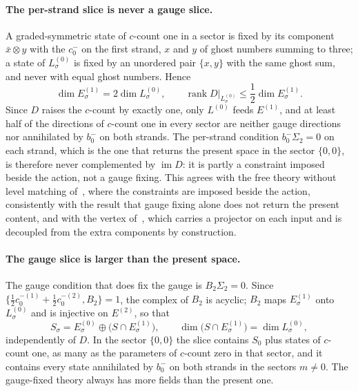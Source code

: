 \paragraph{The per-strand slice is never a gauge slice.}
A graded-symmetric state of $c$-count one in a sector is fixed by its component $\bar x \otimes y$ with the $c_0^-$ on the first strand, $x$ and $y$ of ghost numbers summing to three; a state of $L^{(0)}_\sigma$ is fixed by an unordered pair $\{ x, y \}$ with the same ghost sum, and never with equal ghost numbers.
Hence
\begin{equation}
  \label{eq:gbv:counting}
  \dim E^{(1)}_\sigma
    = 2 \dim L^{(0)}_\sigma,
  \qquad
  \operatorname{rank} D|_{L^{(0)}_\sigma}
    \le \frac{1}{2} \dim E^{(1)}_\sigma.
\end{equation}
Since $D$ raises the $c$-count by exactly one, only $L^{(0)}$ feeds $E^{(1)}$, and at least half of the directions of $c$-count one in every sector are neither gauge directions nor annihilated by $b_0^-$ on both strands.
The per-strand condition $b_0^- \Sigma_2 = 0$ on each strand, which is the one that returns the present space in the sector $\{ 0, 0 \}$, is therefore never complemented by $\operatorname{im} D$: it is partly a constraint imposed beside the action, not a gauge fixing.
This agrees with the free theory without level matching of~\cite{Erbin:2023:ClosedStringTheory}, where the constraints are imposed beside the action, consistently with the result that gauge fixing alone does not return the present content, and with the vertex of~\cite{Okawa:2022:ClosedStringField}, which carries a projector on each input and is decoupled from the extra components by construction.

\paragraph{The gauge slice is larger than the present space.}
The gauge condition that does fix the gauge is $B_2 \Sigma_2 = 0$.
Since $\{ \tfrac12 c_0^{-(1)} + \tfrac12 c_0^{-(2)}, B_2 \} = 1$, the complex of $B_2$ is acyclic; $B_2$ maps $E^{(1)}_\sigma$ onto $L^{(0)}_\sigma$ and is injective on $E^{(2)}$, so that
\begin{equation}
  \label{eq:gbv:slice}
  S_\sigma
    = E^{(0)}_\sigma \oplus \big( S \cap E^{(1)}_\sigma \big),
  \qquad
  \dim \big( S \cap E^{(1)}_\sigma \big)
    = \dim L^{(0)}_\sigma,
\end{equation}
independently of $D$.
In the sector $\{ 0, 0 \}$ the slice contains $S_0$ plus states of $c$-count one, as many as the parameters of $c$-count zero in that sector, and it contains every state annihilated by $b_0^-$ on both strands in the sectors $m \neq 0$.
The gauge-fixed theory always has more fields than the present one.


